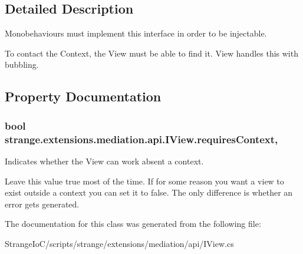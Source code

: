 \subsection{Detailed Description}
Monobehaviours must implement this interface in order to be injectable. 

To contact the Context, the View must be able to find it. View handles this with bubbling. 

\subsection{Property Documentation}
\hypertarget{interfacestrange_1_1extensions_1_1mediation_1_1api_1_1_i_view_a0d9c314f274cd64133a8c97116ba9332}{
\subsubsection[{requires\-Context}]{\setlength{\rightskip}{0pt plus 5cm}bool strange.\-extensions.\-mediation.\-api.\-I\-View.\-requires\-Context\hspace{0.3cm}{\ttfamily [get]}, {\ttfamily [set]}}}\label{interfacestrange_1_1extensions_1_1mediation_1_1api_1_1_i_view_a0d9c314f274cd64133a8c97116ba9332}


Indicates whether the View can work absent a context. 

Leave this value true most of the time. If for some reason you want a view to exist outside a context you can set it to false. The only difference is whether an error gets generated. 

The documentation for this class was generated from the following file\-:\begin{DoxyCompactItemize}
\item 
Strange\-Io\-C/scripts/strange/extensions/mediation/api/I\-View.\-cs\end{DoxyCompactItemize}
